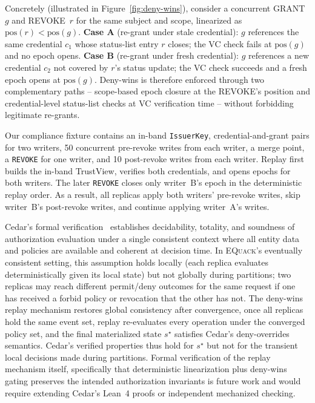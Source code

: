 \documentclass[10pt,journal,compsoc]{IEEEtran}
\newcommand{\equack}{\textsc{EQuack}}
\begin{document}
Concretely (illustrated in Figure~\ref{fig:deny-wins}), consider a concurrent \textsc{GRANT}~$g$ and \textsc{REVOKE}~$r$ for the same subject and scope, linearized as $\mathrm{pos}(r) < \mathrm{pos}(g)$. \textbf{Case A} (re-grant under stale credential): $g$ references the same credential $c_1$ whose status-list entry $r$ closes; the VC check fails at $\mathrm{pos}(g)$ and no epoch opens. \textbf{Case B} (re-grant under fresh credential): $g$ references a new credential $c_2$ not covered by $r$'s status update; the VC check succeeds and a fresh epoch opens at $\mathrm{pos}(g)$. Deny-wins is therefore enforced through two complementary paths -- scope-based epoch closure at the \textsc{REVOKE}'s position and credential-level status-list checks at VC verification time -- without forbidding legitimate re-grants.

Our compliance fixture contains an in-band \texttt{IssuerKey}, credential-and-grant pairs for two writers, 50 concurrent pre-revoke writes from each writer, a merge point, a \texttt{REVOKE} for one writer, and 10 post-revoke writes from each writer. Replay first builds the in-band TrustView, verifies both credentials, and opens epochs for both writers. The later \texttt{REVOKE} closes only writer~B's epoch in the deterministic replay order. As a result, all replicas apply both writers' pre-revoke writes, skip writer~B's post-revoke writes, and continue applying writer~A's writes.

Cedar's formal verification~\cite{cutler2024cedar} establishes decidability, totality, and soundness of authorization evaluation under a single consistent context where all entity data and policies are available and coherent at decision time. In \equack{}'s eventually consistent setting, this assumption holds locally (each replica evaluates deterministically given its local state) but not globally during partitions; two replicas may reach different permit/deny outcomes for the same request if one has received a forbid policy or revocation that the other has not. The deny-wins replay mechanism restores global consistency after convergence, once all replicas hold the same event set, replay re-evaluates every operation under the converged policy set, and the final materialized state $s^\star$ satisfies Cedar's deny-overrides semantics. Cedar's verified properties thus hold for $s^\star$ but not for the transient local decisions made during partitions. Formal verification of the replay mechanism itself, specifically that deterministic linearization plus deny-wins gating preserves the intended authorization invariants is future work and would require extending Cedar's Lean~4 proofs or independent mechanized checking.
\end{document}
